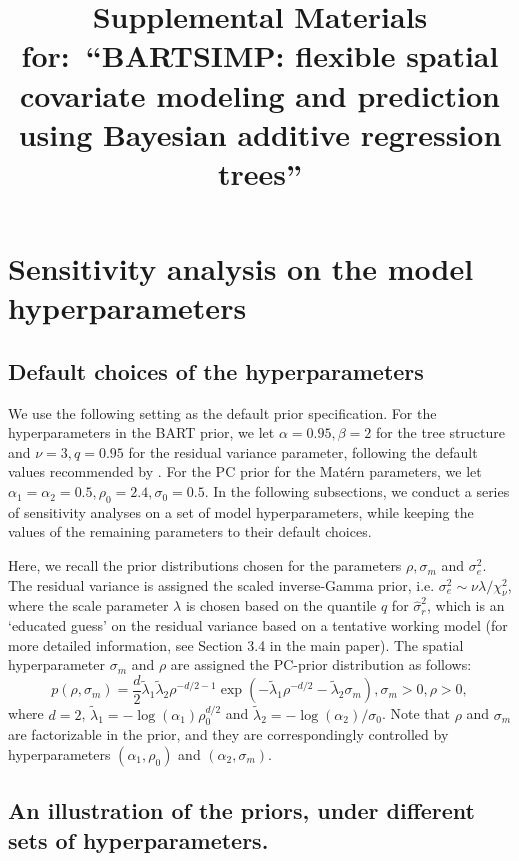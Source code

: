 \documentclass{article}
\title{\bf Supplemental Materials for:~``BARTSIMP: flexible spatial covariate modeling and prediction using Bayesian additive regression trees''}
\begin{document}
\maketitle


\section{Sensitivity analysis on the model hyperparameters}

\subsection{Default choices of the hyperparameters}

We use the following setting as the default prior specification. For the hyperparameters in the BART prior, we let $\alpha = 0.95, \beta = 2$ for the tree structure and $\nu = 3, q = 0.95$ for the residual variance parameter, following the default values recommended by \cite{chipman2010bart}. For the PC prior for the Matérn parameters, we let $\alpha_1 = \alpha_2 = 0.5, \rho_0 = 2.4, \sigma_0 = 0.5$. In the following subsections, we conduct a series of sensitivity analyses on a set of model hyperparameters, while keeping the values of the remaining parameters to their default choices. 

Here, we recall the prior distributions chosen for the parameters $\rho, \sigma_m$ and $\sigma_e^2$. The residual variance is assigned the scaled inverse-Gamma prior, i.e. $\sigma_e^2 \sim \nu \lambda / \chi_\nu^2$, where the scale parameter $\lambda$ is chosen based on the quantile $q$ for $\hat{\sigma}_r^2$, which is an `educated guess' on the residual variance based on a tentative working model (for more detailed information, see Section 3.4 in the main paper). The spatial hyperparameter $\sigma_m$ and $\rho$ are assigned the PC-prior distribution \citep{Fuglstad19} as follows:
$$p(\rho, \sigma_m)=\frac{d}{2} \tilde{\lambda}_1 \tilde{\lambda}_2 \rho^{-d / 2-1} \exp \left(-\tilde{\lambda}_1 \rho^{-d / 2}-\tilde{\lambda}_2 \sigma_m\right), \sigma_m>0, \rho>0,$$
where $d=2$, $\tilde{\lambda}_1 = -\log(\alpha_1)\rho_0^{d/2}$ and $\tilde{\lambda}_2 = -{\log (\alpha_2)}/{\sigma_0}$. Note that $\rho$ and $\sigma_m$ are factorizable in the prior, and they are correspondingly controlled by hyperparameters $(\alpha_1, \rho_0)$ and $(\alpha_2, \sigma_m)$.
\subsection{An illustration of the priors, under different sets of hyperparameters.}
\end{document}
